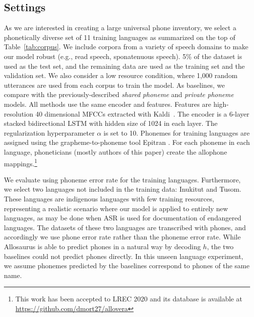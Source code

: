 \documentclass{article}
\newcommand{\drm}[1]{\textcolor{orange}{\small [#1 ---DRM]}}
\begin{document}
\subsection{Settings}
As we are interested in creating a large universal phone inventory, we select a phonetically diverse set of 11 training languages as summarized on the top of Table~\ref{tab:corpus}. We include corpora from a variety of speech domains to make our model robust (e.g., read speech, sponatenuous speech). 5\% of the dataset is used as the test set, and the remaining data are used as the training set and the validation set. We also consider a low resource condition, where 1,000 random utterances are used from each corpus to train the model. As baselines, we compare with the previously-described \textit{shared phoneme} and \textit{private phoneme} models.
All methods use the same encoder and features.
Features are high-resolution 40 dimensional MFCCs extracted with Kaldi~\cite{povey2011kaldi}. The encoder is a 6-layer stacked bidirectional LSTM with hidden size of 1024 in each layer. The regularization hyperparameter $\alpha$ is set to 10.
Phonemes for training languages are assigned using the grapheme-to-phoneme tool Epitran \cite{mortensen2018epitran}.
For each phoneme in each language, phoneticians (mostly authors of this paper) create the allophone mappings.\footnote{This work has been accepted to LREC 2020 and its database is available at \url{https://github.com/dmort27/allovera}}

We evaluate using phoneme error rate for the training languages.
Furthermore, we select two languages not included in the training data: Inukitut and Tusom.
These languages are indigenous languages with few training resources, representing a realistic scenario where our model is applied to entirely new languages, as may be done when ASR is used for documentation of endangered languages.
The datasets of these two languages are transcribed with phones, and accordingly we use phone error rate rather than the phoneme error rate.
While Allosaurus is able to predict phones in a natural way by decoding $h$, the two baselines could not predict phones directly. In this unseen language experiment, we assume phonemes predicted by the baselines correspond to phones of the same name.



\end{document}
